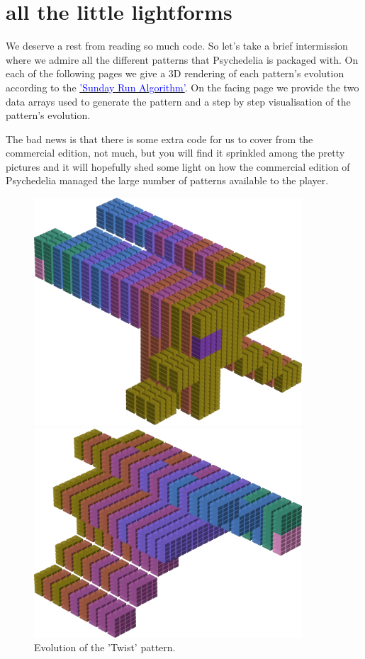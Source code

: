 \chapter{all the little lightforms} 
\label{sec:patterns}
\rhead[]{\leftmark}
\lstset{style=6502Style}

We deserve a rest from reading so much code. So let's take a brief intermission where
we admire all the different patterns that Psychedelia is packaged with. On each of the following
pages we give a 3D rendering of each pattern's evolution according to the
\hyperref[sec:listing_pattern]{\textcolor{blue}{'Sunday Run Algorithm'}}.
On the facing page we provide the two data arrays used to generate the pattern and a step by step
visualisation of the pattern's evolution.

The bad news is that there is some extra code for us to cover from the commercial edition, not much,
but you will find it sprinkled among the pretty pictures and it will hopefully shed some light
on how the commercial edition of Psychedelia managed the large number of patterns available to the
player.

\begin{figure}[H]
    \centering
    \begin{adjustbox}{width=10cm,center}
      \includegraphics[width=10cm]{src/colorspace_patterns/pattern0-45.png}%
    \end{adjustbox}
    \begin{adjustbox}{width=10cm}
      \includegraphics[width=10cm]{src/colorspace_patterns/pattern0-225.png}%
    \end{adjustbox}
\caption{Evolution of the 'Twist' pattern.}
\end{figure}
\clearpage

